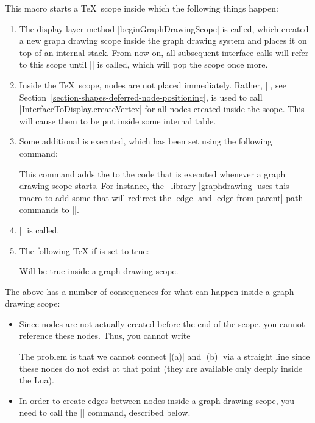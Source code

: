 \begin{command}{\pgfgdbeginscope}
  This macro starts a \TeX\ scope inside which the following things
  happen: 
  \begin{enumerate}
  \item The display layer method |beginGraphDrawingScope| is
    called, which created a new graph drawing scope inside the graph
    drawing system and places it on top of an internal stack. From now
    on, all subsequent interface calls will refer to this scope until
    |\pgfgdendscope| is called, which will pop the scope once more. 
  \item Inside the \TeX\ scope, nodes are not placed
    immediately. Rather,  |\pgfpositionnodelater|, see
    Section~\ref{section-shapes-deferred-node-positioning}, is used to
    call |InterfaceToDisplay.createVertex| for all nodes created
    inside the scope. This will cause them to be put inside some internal
    table. 
  \item Some additional  is executed, which has been set
    using the following command:
    \begin{command}{\pgfgdaddspecificationhook{}}
      This command adds the  to the code that is executed
      whenever a graph drawing scope starts. For instance, the
      \tikzname\ library |graphdrawing| uses this macro to add some
       that will redirect the |edge| and |edge from parent|
      path commands to |\pgfgdedge|.
    \end{command}
  \item |\pgftransformreset| is called. 
  \item The following \TeX-if is set to true:
    {
      \let\ifpgfgdgraphdrawingscopeactive=\relax
      \begin{textoken}{\ifpgfgdgraphdrawingscopeactive}
        Will be true inside a graph drawing scope.
      \end{textoken}
    }
  \end{enumerate}
  The above has a number of consequences for what can happen inside a
  graph drawing scope:
  \begin{itemize}
  \item Since nodes are not actually created before the end of the
    scope, you cannot reference these nodes. Thus, you cannot write
\begin{codeexample}
\end{codeexample}
    The problem is that we cannot connect |(a)| and |(b)| via a
    straight line since these nodes do not exist at that point (they
    are available only deeply inside the Lua).
  \item In order to create edges between nodes inside a graph drawing
    scope, you need to call the |\pgfgdedge| command, described below.
  \end{itemize}
  

\end{command}

